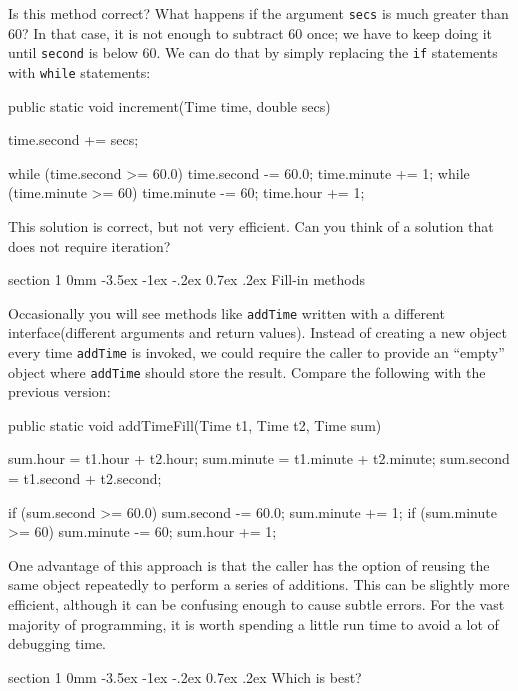 \documentclass{book}
\makeatletter
\renewcommand{\section}{\@startsection 
    {section} {1} {0mm}%
    {-3.5ex \@plus -1ex \@minus -.2ex}%
    {0.7ex \@plus.2ex}%
    {\normalfont\Large\bfseries}}
\makeatother
\begin{document}
Is this method correct?  What happens if the argument {\tt secs}
is much greater than 60?  In that case, it is not enough to
subtract 60 once; we have to keep doing it until {\tt second}
is below 60.  We can do that by simply replacing the {\tt if}
statements with {\tt while} statements:

\begin{verbatimtab}
  public static void increment(Time time, double secs) {
    time.second += secs;

    while (time.second >= 60.0) {
      time.second -= 60.0;
      time.minute += 1;
    }
    while (time.minute >= 60) {
      time.minute -= 60;
      time.hour += 1;
    }
  }
\end{verbatimtab}
%
This solution is correct, but not very efficient.
Can you think of a solution that does not require iteration?

\section{Fill-in methods}

Occasionally you will see methods like {\tt addTime} written
with a different interface(different arguments and return values).
Instead of creating a new object every time {\tt addTime} is
invoked, we could require the caller to provide an ``empty''
object where {\tt addTime} should store the result.  Compare
the following with the previous version:

\begin{verbatimtab}
  public static void addTimeFill(Time t1, Time t2, Time sum) {
    sum.hour = t1.hour + t2.hour;
    sum.minute = t1.minute + t2.minute;
    sum.second = t1.second + t2.second;

    if (sum.second >= 60.0) {
      sum.second -= 60.0;
      sum.minute += 1;
    }
    if (sum.minute >= 60) {
      sum.minute -= 60;
      sum.hour += 1;
    }
  }
\end{verbatimtab}
%
One advantage of this approach is that the caller has the option
of reusing the same object repeatedly to perform a series
of additions.  This can be slightly more efficient, although
it can be confusing enough to cause subtle errors.
For the vast majority of programming, it is worth
spending a little run time to avoid a lot of debugging time.

\section{Which is best?}
\end{document}
